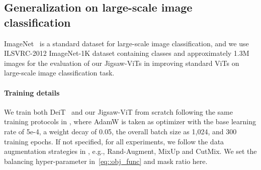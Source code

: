 \documentclass{article}
\begin{document}
    
\subsection{Generalization on large-scale image classification}
\label{subsec:imagenet}

\captionsetup[table]{farskip=2pt,captionskip=1pt,aboveskip=4pt}
    \begin{table}[t]
        \centering
        \renewcommand{\arraystretch}{1.1}
        \caption{{\textbf{Image classification on ImageNet-1K~\cite{deng2009imagenet} validation set {and ImageNet V2~\cite{recht2019imagenet}.}} 
        We compare to DeiT~\cite{touvron2021training} with different capacities and report top-1 accuracy (). We also show how much each Jigsaw-ViT model is above the baseline with \textcolor{ForestGreen}{}.}}
        \label{tab::imagenet}
\end{table}

ImageNet~\cite{deng2009imagenet} is a standard dataset for large-scale image classification, and we use ILSVRC-2012 ImageNet{-1K} dataset containing  classes and approximately 1.3M images for the evaluation of our Jigsaw-ViTs in improving  standard ViTs on large-scale image classification task.

\paragraph{Training details}
We train both DeiT~\cite{touvron2021training} and our Jigsaw-ViT from scratch following the same training protocols in \cite{touvron2021training}, where AdamW is taken as optimizer with the base learning rate of 5e-4, a weight decay of 0.05, the overall batch size as 1,024, and 300 training epochs. 
If not specified, for all experiments, we follow the data augmentation strategies in \cite{touvron2021training}, e.g., Rand-Augment, MixUp and CutMix. 
We set the balancing hyper-parameter in~\eqref{eq::obj_func}  and mask ratio  here.
\end{document}
